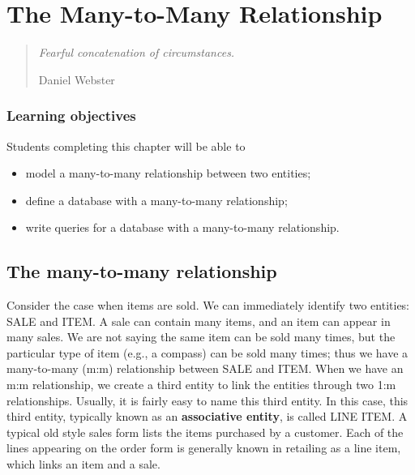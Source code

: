 \documentclass[
]{article}
\begin{document}
\hypertarget{the-many-to-many-relationship}{%
\section{The Many-to-Many Relationship}\label{the-many-to-many-relationship}}

\begin{quote}
\emph{Fearful concatenation of circumstances.}

Daniel Webster
\end{quote}

\hypertarget{learning-objectives-4}{%
\subsubsection*{Learning objectives}\label{learning-objectives-4}}

Students completing this chapter will be able to

\begin{itemize}
\item
  model a many-to-many relationship between two entities;
\item
  define a database with a many-to-many relationship;
\item
  write queries for a database with a many-to-many relationship.
\end{itemize}

\hypertarget{the-many-to-many-relationship-1}{%
\subsection*{The many-to-many relationship}\label{the-many-to-many-relationship-1}}

Consider the case when items are sold. We can immediately identify two entities: SALE and ITEM. A sale can contain many items, and an item can appear in many sales. We are not saying the same item can be sold many times, but the particular type of item (e.g., a compass) can be sold many times; thus we have a many-to-many (m:m) relationship between SALE and ITEM. When we have an m:m relationship, we create a third entity to link the entities through two 1:m relationships. Usually, it is fairly easy to name this third entity. In this case, this third entity, typically known as an \textbf{associative entity}, is called LINE ITEM. A typical old style sales form lists the items purchased by a customer. Each of the lines appearing on the order form is generally known in retailing as a line item, which links an item and a sale.
\end{document}
